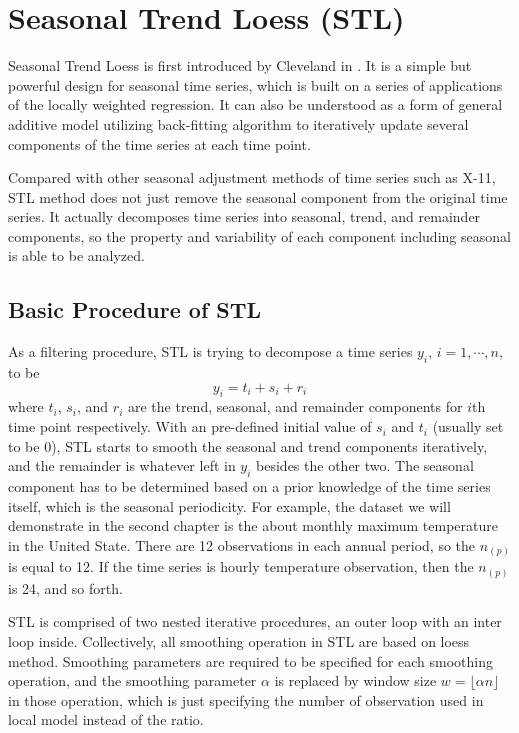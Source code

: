 \section{Seasonal Trend Loess (STL)}
\label{sec:stl}

Seasonal Trend Loess is first introduced by Cleveland in 
\cite{Cleveland:1990}. It is a simple but powerful design for seasonal time
series, which is built on a series of applications of the locally weighted 
regression. It can also be understood as a form of general additive model utilizing
back-fitting algorithm to iteratively update several components of the time series
at each time point.  

Compared with other seasonal adjustment methods of time series such as X-11,
STL method does not just remove the seasonal component from the original 
time series. It actually decomposes time series into seasonal, trend, and remainder
components, so the property and variability of each component including seasonal 
is able to be analyzed. 

\subsection{Basic Procedure of STL}

As a filtering procedure, STL is trying to decompose a time series 
$y_i$, $i=1, \cdots, n$, to be
\begin{equation} 
\label{stlModel}
y_i = t_i + s_i + r_i
\end{equation}
where $t_i$, $s_i$, and $r_i$ are the trend, seasonal, and remainder components
for $i$th time point respectively. With an pre-defined initial value of $s_i$ and 
$t_i$ (usually set to be 0), STL starts to smooth the seasonal and trend components 
iteratively, and the remainder is whatever left in $y_i$ besides the other two. 
The seasonal component has to be determined based on a prior knowledge of the time
series itself, which is the seasonal periodicity. For example, the dataset we will
demonstrate in the second chapter is the about monthly maximum temperature in the
United State. There are 12 observations in each annual period, so the $n_{(p)}$ 
is equal to 12. If the time series is hourly temperature observation, then the
$n_{(p)}$ is 24, and so forth.

STL is comprised of two nested iterative procedures, an outer loop with an inter 
loop inside. Collectively, all smoothing operation in STL are based on loess 
method. Smoothing parameters are required to be specified for each smoothing 
operation, and the smoothing parameter $\alpha$ is replaced by window size
$w=\lfloor \alpha n\rfloor$ in those operation, which is just specifying the 
number of observation used in local model instead of the ratio.  

